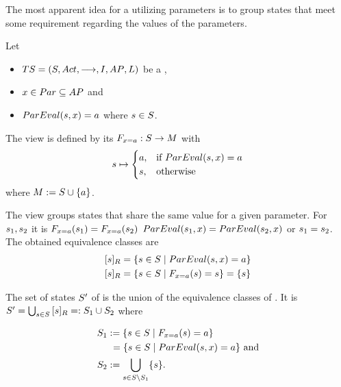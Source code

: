 \documentclass[preview]{standalone}
\begin{document}
The most apparent idea for a \viewN utilizing parameters is to group states that meet some requirement regarding the values of the parameters.


\begin{definition}
	Let
	\begin{itemize}
		\item ${TS} = {({S}, {Act}, {\longrightarrow}, {I}, {AP}, {L})}$ be a \chosengraphtypeN,
		\item ${x} \in {Par} \subseteq {AP}$ and 
		\item ${ParEval}({s}, {x}) = {a}$ where ${s} \in {S}$.		
	\end{itemize} 
	The view \viewparamvalueseq is defined by its \grpfctN ${{{F}}_{{x} = {a}}} : {S} \to {\ensuremath{{M}}}$ with
	\[
	{s} \mapsto
	\begin{cases}
		{a}, &\text{if } {ParEval}({s}, {x}) = {a}\\
		{s}, 	&\text{otherwise}
	\end{cases}
	\]
	where ${{M}} := {S} \cup \{a\}$.
\end{definition}

The view \viewparamvalueseq groups states that share the same value for a given parameter. For ${s}_1, {s}_2$ it is ${{{F}}_{{x} = {a}}}({s}_1) = {{{F}}_{{x} = {a}}}({s}_2)$ \iffN ${ParEval}({s}_1, {x}) = {ParEval}({s}_2, {x})$ or ${s}_1 = {s}_2$. The obtained equivalence classes are
\begin{align*}
	\eqclassv{\state} &= \{\state \in \states \mid \parameval(\state, \param) = \paramval\} \\
	\eqclassv{\state} &= \{\state \in \states \mid \gfctparamvalueseq(\state) = \state\} = \{\state\}
\end{align*}

The set of states ${S}'$ of \viewparamvalueseq is the union of the equivalence classes of \eqrelview. It is ${S}' = \bigcup_{{s} \in {S}} {{[{s}]_{{R}}}} =: {S}_1 \cup {S}_2$ where

\begin{align*}
	\states_1 &:= \{\state \in \states \mid \gfctparamvalueseq(\state) = \paramval\} \\
	&\hspace{1.15mm}= \{\state \in \states  \mid \parameval(\state, \param) = \paramval\} \text{ and} \\
	\states_2 &:= \remstates.
\end{align*}
\end{document}
